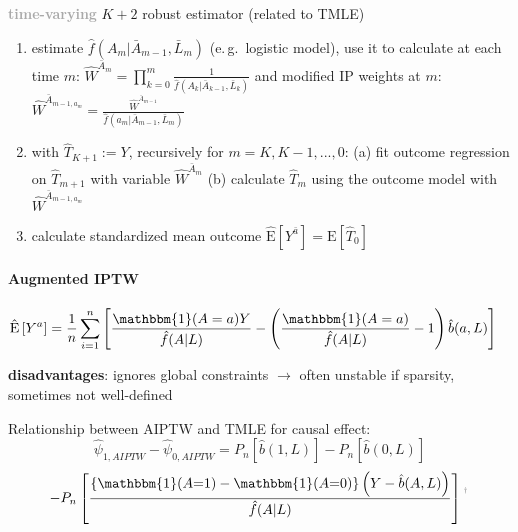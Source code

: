 \documentclass[8pt,twoside]{extarticle}
\begin{document}
\begin{multicols}{2}
{\begin{minipage}{28em}
\textbf{\textcolor{darkgray}{time-varying}}  $K+2$ robust estimator (related to TMLE)
\begin{enumerate}[leftmargin=*, itemsep=0em, topsep=0pt, partopsep=0pt,parsep=0pt]
\setlength{\itemsep}{0pt}%
\setlength{\parskip}{0pt}
\item 
estimate $\hat{f}\left(A_m|\bar{A}_{m-1}, \bar{L}_m\right)$ (e.\,g.\ logistic model), use it to \newline
calculate at each time $m$: $\widehat{W}^{\bar{A}_m} = \prod_{k=0}^m\frac{1}{\hat{f}\left(A_k|\bar{A}_{k-1}, \bar{L}_k\right)}$ and modified IP weights at $m$: $\widehat{W}^{\bar{A}_{m-1, a_m}} = \frac{\widehat{W}^{\bar{A}_{m-1}}}{\hat{f}\left(a_m|\bar{A}_{m-1}, \bar{L}_m\right)} $
\item with $\widehat{T}_{K+1}:=Y$, recursively for $m=K, K-1, ..., 0$:\newline
 (a) fit outcome regression on $\widehat{T}_{m+1}$ with variable  $\widehat{W}^{\bar{A}_m}$\newline
 (b) calculate $\widehat{T}_{m}$ using the outcome model with $\widehat{W}^{\bar{A}_{m-1, a_m}}$
\item calculate standardized mean outcome $\widehat{\mathrm{E}}\left[Y^{\bar{a}}\right] = \mathrm{E}\left[\widehat{T}_0\right]$
\end{enumerate}

\end{minipage}}


\paragraph{Augmented IPTW} \citep{hernan2023causal}
\begin{align*}
\hat{\mathrm{E}}\left[Y^{a}\right] &= \frac{1}{n}\sum_{i=1}^n\left[
\frac{\mathbbm{1}(A=a)Y}{\hat{f}(A|L)} - \left(\frac{\mathbbm{1}(A=a)}{\hat{f}(A|L)} -1\right)\hat{b}(a,L)
\right]  %
\end{align*}

 
\noindent \textbf{disadvantages}: ignores global constraints $\to$ often unstable if sparsity, sometimes not well-defined \citep{van2011targeted}
 

\begin{mdframed}[style=MyFrame,nobreak=true, innerleftmargin=2pt, innerrightmargin=2pt]
Relationship between AIPTW and TMLE for causal effect:
$$\hat{\psi}_{1, AIPTW} - \hat{\psi}_{0, AIPTW} = P_n\left[\hat{b}(1,L)\right] -  P_n\left[\hat{b}(0,L)\right] $$
$$ - P_n \left[  \frac{\left\{\mathbbm{1}(A{=}1)-\mathbbm{1}(A{=}0)\right\}\left(Y-\hat{b}(A,L)\right)}{\hat{f}(A|L)}\right]\textcolor{gray}{^{^\dagger}}$$


\end{mdframed}
\end{multicols}
\end{document}
